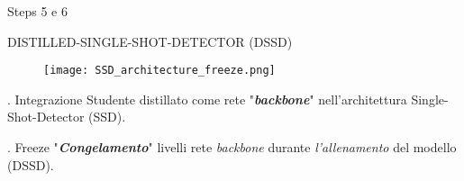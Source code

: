 \begin{subsection}{Steps 5 e 6}
    \begin{frame}{DISTILLED-SINGLE-SHOT-DETECTOR (DSSD)}
        \begin{figure}
            \centering
            \texttt{[image: SSD\_architecture\_freeze.png]}
            \centering
        \end{figure}
        \begin{minipage}{\linewidth}
            \centering
            \begin{minipage}{0.45\linewidth}
                \begin{block}{. Integrazione}
                    \centering
                    Studente distillato come rete "{\bfseries{\emph{backbone}}}" nell'architettura {Single-Shot-Detector (SSD)}.    
                \end{block}
            \end{minipage}
            \hspace{0.5cm}
            \begin{minipage}{0.45\linewidth}
                \begin{block}{. Freeze}
                    \centering
                    "{\bfseries{\emph{Congelamento}}}" livelli rete \emph{backbone} durante \emph{l'allenamento} del modello (DSSD).
                \end{block}
            \end{minipage}
        \end{minipage}   
    \end{frame}
\end{subsection}
